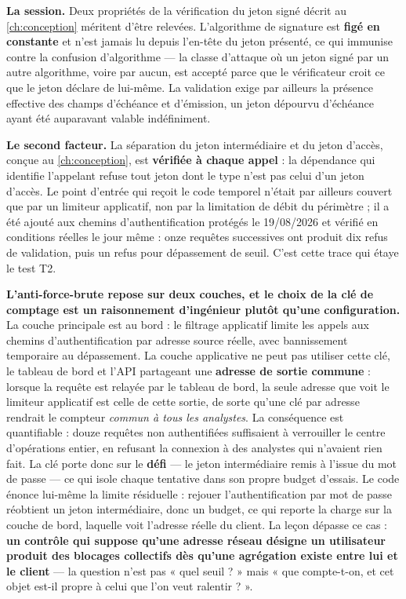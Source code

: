 \textbf{La session.} Deux propriétés de la vérification du jeton signé décrit au \cref{ch:conception} méritent
d'être relevées. L'algorithme de signature est \textbf{figé en constante} et n'est jamais lu depuis
l'en-tête du jeton présenté, ce qui immunise contre la confusion d'algorithme --- la classe
d'attaque où un jeton signé par un autre algorithme, voire par aucun, est accepté parce que le
vérificateur croit ce que le jeton déclare de lui-même. La validation exige par ailleurs la présence
effective des champs d'échéance et d'émission, un jeton dépourvu d'échéance ayant été auparavant
valable indéfiniment.

\textbf{Le second facteur.} La séparation du jeton intermédiaire et du jeton d'accès, conçue au
\cref{ch:conception}, est \textbf{vérifiée à chaque appel} : la dépendance qui identifie l'appelant refuse
tout jeton dont le type n'est pas celui d'un jeton d'accès. Le point d'entrée qui reçoit le code
temporel n'était par ailleurs couvert que par un limiteur applicatif, non par la limitation de
débit du périmètre ; il a été ajouté aux chemins d'authentification protégés le 19/08/2026 et
vérifié en conditions réelles le jour même : onze requêtes successives ont produit dix refus de
validation, puis un refus pour dépassement de seuil. C'est cette trace qui étaye le test T2.

\textbf{L'anti-force-brute repose sur deux couches, et le choix de la clé de comptage est un
raisonnement d'ingénieur plutôt qu'une configuration.} La couche principale est au bord : le
filtrage applicatif limite les appels aux chemins d'authentification par adresse source réelle, avec
bannissement temporaire au dépassement. La couche applicative ne peut pas utiliser cette clé, le
tableau de bord et l'API partageant une \textbf{adresse de sortie commune} : lorsque la requête est
relayée par le tableau de bord, la seule adresse que voit le limiteur applicatif est celle de cette
sortie, de sorte qu'une clé par adresse rendrait le compteur \emph{commun à tous les analystes}. La
conséquence est quantifiable : douze requêtes non authentifiées suffisaient à verrouiller le centre
d'opérations entier, en refusant la connexion à des analystes qui n'avaient rien fait. La clé porte
donc sur le \textbf{défi} --- le jeton intermédiaire remis à l'issue du mot de passe --- ce qui
isole chaque tentative dans son propre budget d'essais. Le code énonce lui-même la limite
résiduelle : rejouer l'authentification par mot de passe réobtient un jeton intermédiaire, donc un
budget, ce qui reporte la charge sur la couche de bord, laquelle voit l'adresse réelle du client. La
leçon dépasse ce cas : \textbf{un contrôle qui suppose qu'une adresse réseau désigne un utilisateur
produit des blocages collectifs dès qu'une agrégation existe entre lui et le client} --- la question
n'est pas « quel seuil ? » mais « que compte-t-on, et cet objet est-il propre à celui que l'on veut
ralentir ? ».

